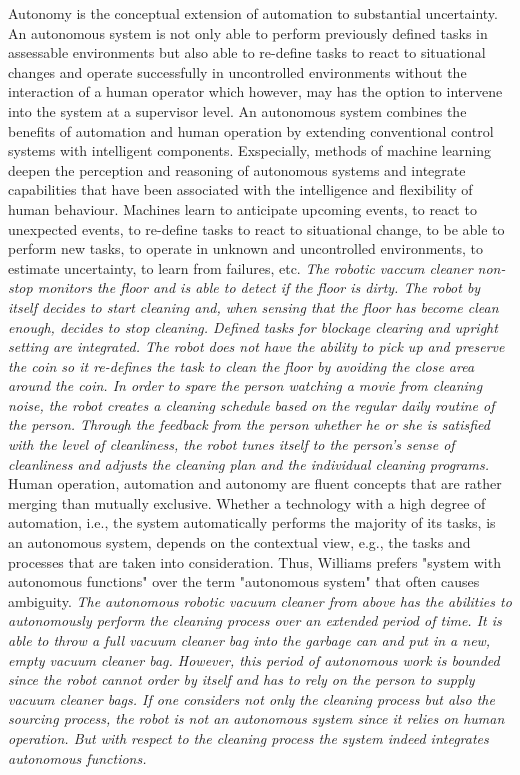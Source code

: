 Autonomy is the conceptual extension of automation to substantial uncertainty.
An autonomous system is not only able to perform previously defined tasks in assessable environments
but also able to re-define tasks to react to situational changes and operate successfully in uncontrolled environments
without the interaction of a human operator which however, may has the option to intervene into the system at a supervisor level.
An autonomous system combines the benefits of automation and human operation by extending conventional control systems with intelligent components.
Exspecially, methods of machine learning deepen the perception and reasoning of autonomous systems and 
integrate capabilities that have been associated with the intelligence and flexibility of human behaviour.
Machines learn to anticipate upcoming events, to react to unexpected events,
to re-define tasks to react to situational change, to be able to perform new tasks,
to operate in unknown and uncontrolled environments, to estimate uncertainty, to learn from failures, etc.
\textit{The robotic vaccum cleaner non-stop monitors the floor and is able to detect if the floor is dirty.
The robot by itself decides to start cleaning and, when sensing that the floor has become clean enough, decides to stop cleaning.
Defined tasks for blockage clearing and upright setting are integrated.
The robot does not have the ability to pick up and preserve the coin so it re-defines the task to clean the floor
by avoiding the close area around the coin.
In order to spare the person watching a movie from cleaning noise, 
the robot creates a cleaning schedule based on the regular daily routine of the person.
Through the feedback from the person whether he or she is satisfied with the level of cleanliness,
the robot tunes itself to the person's sense of cleanliness and adjusts the cleaning plan and the individual cleaning programs.}
Human operation, automation and autonomy are fluent concepts that are rather merging than mutually exclusive.
Whether a technology with a high degree of automation, i.e., the system automatically performs the majority of its tasks,
is an autonomous system, depends on the contextual view, e.g., the tasks and processes that are taken into consideration.
Thus, Williams \cite{Williams} prefers "system with autonomous functions" over the term "autonomous system" that often causes ambiguity.
\textit{The autonomous robotic vacuum cleaner from above has the abilities to autonomously perform the cleaning process 
over an extended period of time.
It is able to throw a full vacuum cleaner bag into the garbage can and put in a new, empty vacuum cleaner bag. 
However, this period of autonomous work is bounded since the robot cannot order by itself and has to rely on the person 
to supply vacuum cleaner bags.
If one considers not only the cleaning process but also the sourcing process, the robot is not an autonomous system 
since it relies on human operation. 
But with respect to the cleaning process the system indeed integrates autonomous functions.}


